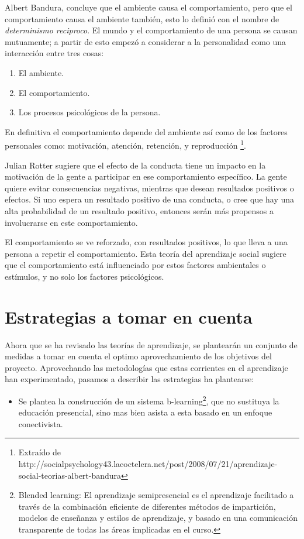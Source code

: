Albert Bandura, concluye que el ambiente causa el comportamiento, pero que el
comportamiento causa el ambiente también, esto lo definió con el nombre de
\emph{determinismo reciproco}. El mundo y el comportamiento de una persona se
causan mutuamente; a partir de esto empezó a considerar a la personalidad como
una interacción entre tres cosas:

\begin{enumerate}
\item El ambiente.
\item El comportamiento.
\item Los procesos psicológicos de la persona.
\end{enumerate}

En definitiva el comportamiento depende del ambiente así como de los factores
personales como: motivación, atención, retención, y reproducción
\footnote{Extraído de 
http://socialpsychology43.lacoctelera.net/post/2008/07/21/aprendizaje-social-teorias-albert-bandura}.

Julian Rotter sugiere que el efecto de la conducta tiene un impacto en la
motivación de la gente a participar en ese comportamiento específico. La gente
quiere evitar consecuencias negativas, mientras que desean resultados positivos
o efectos. Si uno espera un resultado positivo de una conducta, o cree que hay
una alta probabilidad de un resultado positivo, entonces serán más propensos a
involucrarse en este comportamiento.

El comportamiento se ve reforzado, con resultados positivos, lo que lleva a una
persona a repetir el comportamiento. Esta teoría del aprendizaje social sugiere
que el comportamiento está influenciado por estos factores ambientales o
estímulos, y no solo los factores psicológicos.

\section{Estrategias a tomar en cuenta}

Ahora que se ha revisado las teorías de aprendizaje, se plantearán un conjunto
de medidas a tomar en cuenta el optimo aprovechamiento de los objetivos del
proyecto. Aprovechando las metodologías que estas corrientes en el aprendizaje han experimentado, pasamos a describir las estrategias ha plantearse:

\begin{itemize}
\item{Se plantea la construcción de un sistema b-learning\footnote{Blended learning: El aprendizaje semipresencial es el aprendizaje facilitado a través
de la combinación eficiente de diferentes métodos de impartición, modelos de enseñanza y estilos de aprendizaje, y basado en una comunicación transparente de todas las áreas implicadas en el curso.}}, que no sustituya la educación presencial, sino mas bien asista a esta basado en un enfoque conectivista.
\end{itemize}
